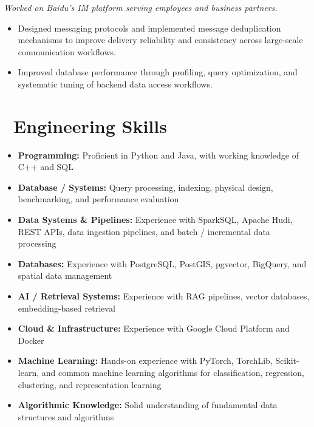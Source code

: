 \documentclass{resume}
\begin{document}
\textit{Worked on Baidu's IM platform serving employees and business partners.}
\begin{itemize}[parsep=0.4ex]

\item Designed messaging protocols and implemented message deduplication mechanisms to improve delivery reliability and consistency across large-scale communication workflows.


\item Improved database performance through profiling, query optimization, and systematic tuning of backend data access workflows.

\end{itemize}


\section{\faCogs\ \textbf{Engineering Skills}}

\begin{itemize}[parsep=0.4ex]

\item \textbf{Programming:} Proficient in Python and Java, with working knowledge of C++ and SQL

\item \textbf{Database / Systems:} Query processing, indexing, physical design, benchmarking, and performance evaluation

\item \textbf{Data Systems \& Pipelines:} Experience with SparkSQL, Apache Hudi, REST APIs, data ingestion pipelines, and batch / incremental data processing

\item \textbf{Databases:} Experience with PostgreSQL, PostGIS, pgvector, BigQuery, and spatial data management

\item \textbf{AI / Retrieval Systems:} Experience with RAG pipelines, vector databases, embedding-based retrieval

\item \textbf{Cloud \& Infrastructure:} Experience with Google Cloud Platform and Docker

\item \textbf{Machine Learning:} Hands-on experience with PyTorch, TorchLib, Scikit-learn, and common machine learning algorithms for classification, regression, clustering, and representation learning

  \item \textbf{Algorithmic Knowledge:} Solid understanding of fundamental data structures and algorithms
\end{itemize}
\end{document}

